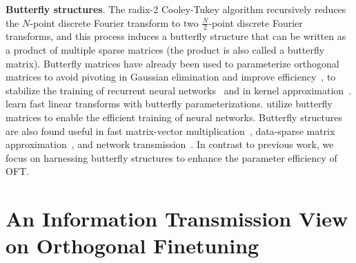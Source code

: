 \textbf{Butterfly structures}. The radix-2 Cooley-Tukey algorithm recursively reduces the $N$-point discrete Fourier transform to two $\frac{N}{2}$-point discrete Fourier transforms, and this process induces a butterfly structure that can be written as a product of multiple sparse matrices (the product is also called a butterfly matrix). Butterfly matrices have already been used to parameterize  orthogonal matrices to avoid pivoting in Gaussian elimination and improve efficiency~\cite{parker1995random}, to stabilize the training of recurrent neural networks~\cite{jing2017tunable} and in kernel approximation~\cite{munkhoeva2018quadrature}. \cite{dao2019learning,dao2019kaleidoscope} learn fast linear transforms with butterfly parameterizations. \cite{chen2022pixelated,dao2022monarch} utilize  butterfly matrices to enable the efficient training of neural networks. Butterfly structures are also found useful in fast matrix-vector multiplication~\cite{michielssen1996multilevel,o2010algorithm}, data-sparse matrix approximation~\cite{li2015butterfly}, and network transmission~\cite{klasing1994broadcasting,li2003linear,rajasingh2016transmission}. In contrast to previous work, we focus on harnessing butterfly structures to enhance the parameter efficiency of OFT.

\section{An Information Transmission View on Orthogonal Finetuning}


